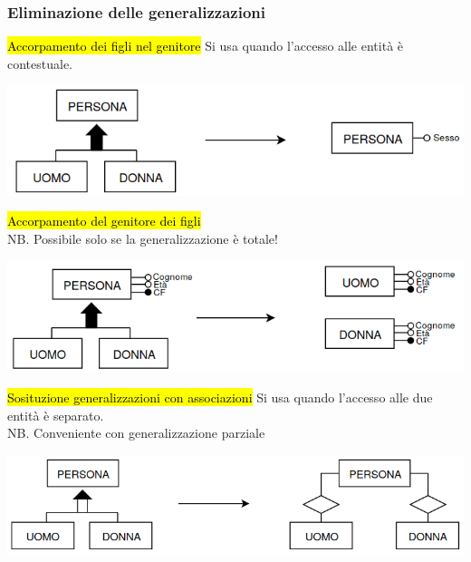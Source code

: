 \documentclass[a4paper]{article}
\begin{document}
\subsubsection{Eliminazione delle generalizzazioni}
\hl{Accorpamento dei figli nel genitore}
Si usa quando l'accesso alle entità è contestuale.
\begin{center}
      \includegraphics[scale=0.45]{img/pl1.png}
\end{center}
%
\hl{Accorpamento del genitore dei figli}\\
NB. Possibile solo se la generalizzazione è totale!
\begin{center}
      \includegraphics[scale=0.45]{img/pl2.png}
\end{center}
%
\hl{Sosituzione generalizzazioni con associazioni} Si usa quando l'accesso alle due entità è separato.
\\NB. Conveniente con generalizzazione parziale
\begin{center}
      \includegraphics[scale=0.45]{img/pl3.png}
\end{center}
\end{document}
